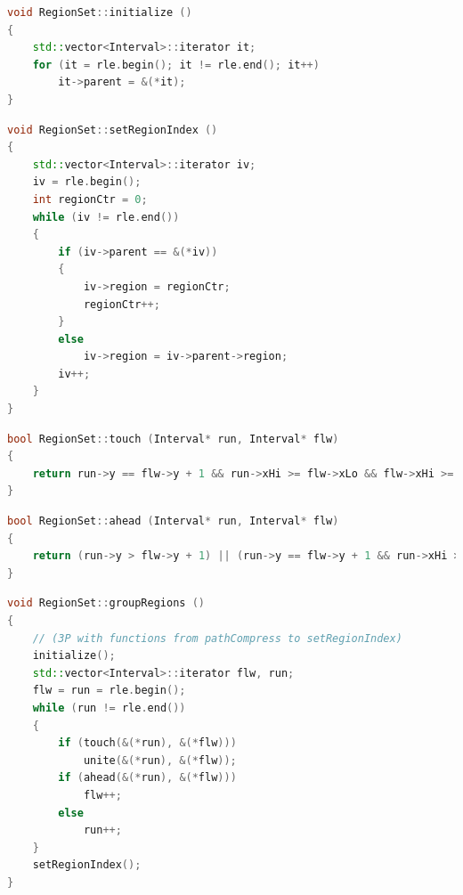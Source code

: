 \documentclass{ezb}
\begin{document}
\begin{lstlisting}[language=C++, caption=Auxiliary routine for group regions]
void RegionSet::initialize ()
{
	std::vector<Interval>::iterator it;
	for (it = rle.begin(); it != rle.end(); it++)
		it->parent = &(*it);
}
\end{lstlisting}

\begin{lstlisting}[language=C++, caption=Auxiliary routine for group regions]
void RegionSet::setRegionIndex ()
{
	std::vector<Interval>::iterator iv;
	iv = rle.begin();
	int regionCtr = 0;
	while (iv != rle.end())
	{
		if (iv->parent == &(*iv))
		{
			iv->region = regionCtr;
			regionCtr++;
		}
		else
			iv->region = iv->parent->region;
		iv++;
	}
}
\end{lstlisting}

\begin{lstlisting}[language=C++, caption=Auxiliary routine for group regions]
bool RegionSet::touch (Interval* run, Interval* flw)
{
	return run->y == flw->y + 1 && run->xHi >= flw->xLo && flw->xHi >= run->xLo;
}
\end{lstlisting}

\begin{lstlisting}[language=C++, caption=Auxiliary routine for group regions]
bool RegionSet::ahead (Interval* run, Interval* flw) 
{
	return (run->y > flw->y + 1) || (run->y == flw->y + 1 && run->xHi > flw->xHi);
}
\end{lstlisting}

\begin{lstlisting}[language=C++, caption=Finds connected regions in the rle intervals]
void RegionSet::groupRegions ()
{
	// (3P with functions from pathCompress to setRegionIndex)
	initialize();
	std::vector<Interval>::iterator flw, run;
	flw = run = rle.begin();
	while (run != rle.end())
	{
		if (touch(&(*run), &(*flw)))
			unite(&(*run), &(*flw));
		if (ahead(&(*run), &(*flw)))
			flw++;
		else
			run++;
	}
	setRegionIndex();
}
\end{lstlisting}
\end{document}
